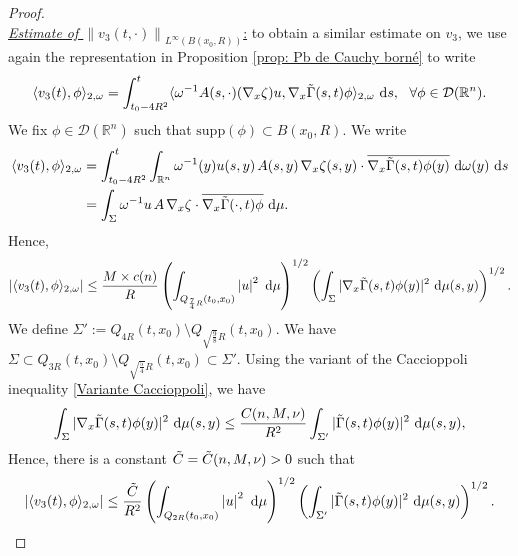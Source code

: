 \documentclass[12pt, letterpaper]{amsart}
\theoremstyle{definition}
\theoremstyle{remark}
\numberwithin{equation}{section}
\begin{document}
\begin{proof}
\begin{equation}
\end{equation}
\underline{\textit{Estimate of $\left\| v_3(t,\cdot) \right\|_{L^\infty(B(x_0,R))}$}:} to obtain a similar estimate on $v_3$, we use again the representation in Proposition \ref{prop: Pb de Cauchy borné} to write 
\begin{equation*}
    \langle v_3(t), \phi \rangle_{2,\omega} = \int_{t_0-4R^2}^{t} \langle \omega^{-1} A(s,\cdot)(\nabla_x \zeta)u, \nabla_x \Tilde{\Gamma}(s,t)\phi \rangle_{2,\omega} \ \mathrm{d} s, \ \ \forall \phi \in \mathcal{D}(\mathbb{R}^n).
\end{equation*}
We fix $\phi \in \mathcal{D}(\mathbb{R}^n)$ such that $\mathrm{supp}(\phi)\subset B(x_0,R)$. We write
\begin{align*}
   \langle v_3(t), \phi \rangle_{2,\omega} &= \int_{t_0-4R^2}^{t} \int_{\mathbb{R}^n} \omega^{-1}(y) u(s,y)\hspace{0.05cm} A(s,y) \hspace{0.05cm} \nabla_x \zeta (s,y)   \cdot \overline{\nabla_x \Tilde{\Gamma}(s,t)\phi (y)} \ \mathrm{d} \omega(y) \ \mathrm{d}s\\&= \int_{\Sigma} \omega^{-1} u \hspace{0.05cm}A \hspace{0.05cm} \nabla_x \zeta \cdot \overline{\nabla_x \Tilde{\Gamma}(\cdot,t)\phi} \ \mathrm{d} \mu.
\end{align*}
Hence,
\begin{equation*}
    \left |  \langle v_3(t), \phi \rangle_{2,\omega} \right |\leq \frac{M\times c(n)}{R}  \left ( \int_{Q_{\frac{7}{4}R}(t_0,x_0) } \left |  u  \right |^2 \ \mathrm d\mu \right )^{1/2}  \left ( \int_{\Sigma}  | \nabla_x \Tilde{\Gamma}(s,t)\phi (y) |^2 \ \mathrm d\mu(s,y)\right )^{1/2}.
\end{equation*}
We define $\Sigma':=Q_{4R}(t,x_0)\setminus Q_{\sqrt{\frac{9}{8}}R}(t,x_0)$. We have $\Sigma \subset Q_{3R}(t,x_0)\setminus Q_{\sqrt{\frac{5}{4}}R}(t,x_0) \subset \Sigma'$. Using the variant of the Caccioppoli inequality \eqref{Variante Caccioppoli}, we have 
\begin{equation*}
    \int_{\Sigma}  | \nabla_x \Tilde{\Gamma}(s,t)\phi (y)   |^2 \ \mathrm d\mu(s,y) \leq \frac{C(n,M,\nu)}{R^2} \int_{\Sigma'}   |  \Tilde{\Gamma}(s,t)\phi (y)   |^2 \ \mathrm d\mu(s,y),
\end{equation*}
Hence, there is a constant $\Tilde{C}=\Tilde{C}(n,M,\nu)>0$ such that
\begin{align}\label{QQQQQ}
    \left |  \langle v_3(t), \phi \rangle_{2,\omega} \right |\leq \frac{\Tilde{C}}{R^2}  \left ( \int_{Q_{2R}(t_0,x_0) } \left |  u  \right |^2 \ \mathrm d\mu \right )^{1/2}  \left ( \int_{\Sigma'}  |  \Tilde{\Gamma}(s,t)\phi (y)  |^2 \ \mathrm d\mu(s,y)\right )^{1/2}.

\end{align}
\end{proof}
\end{document}
